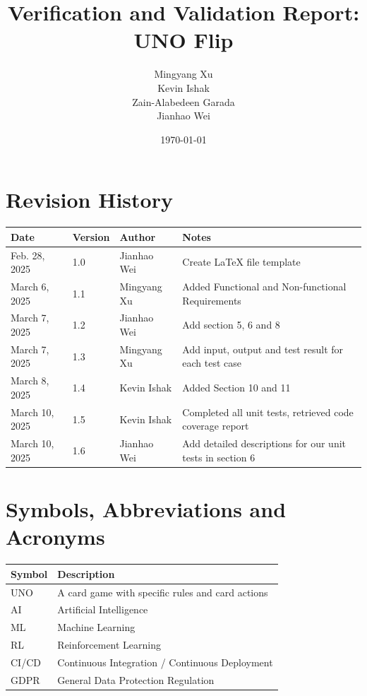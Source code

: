 \documentclass[12pt, titlepage]{article}
\begin{document}
\title{Verification and Validation Report: UNO Flip}
\author{Mingyang Xu\\ Kevin Ishak\\ Zain-Alabedeen Garada\\ Jianhao Wei\\}

\date{\today}

\maketitle


\section{Revision History}

\begin{tabularx}{\textwidth}{p{3cm}p{1cm}p{3cm}X}
\toprule {\bf Date} & {\bf Version} & {\bf Author}& {\bf Notes}\\
\midrule
Feb. 28, 2025 & 1.0 & Jianhao Wei & Create LaTeX file template \\
March 6, 2025 & 1.1 & Mingyang Xu & Added Functional and Non-functional Requirements\\
March 7, 2025 & 1.2 & Jianhao Wei & Add section 5, 6 and 8\\
March 7, 2025 & 1.3 & Mingyang Xu & Add input, output and test result for each test case\\
March 8, 2025 & 1.4 & Kevin Ishak & Added Section 10 and 11\\
March 10, 2025 & 1.5 & Kevin Ishak & Completed all unit tests, retrieved code coverage report\\
March 10, 2025 & 1.6 & Jianhao Wei & Add detailed descriptions for our unit tests in section 6\\

\bottomrule
\end{tabularx}

\newpage

\section{Symbols, Abbreviations and Acronyms}

\renewcommand{\arraystretch}{1.2}
\begin{tabular}{l l} 
  \toprule		
  \textbf{Symbol} & \textbf{Description}\\
  \midrule 
  UNO & A card game with specific rules and card actions\\
  AI & Artificial Intelligence\\
  ML & Machine Learning\\
  RL & Reinforcement Learning\\
  CI/CD & Continuous Integration / Continuous Deployment\\
  GDPR & General Data Protection Regulation\\
  \bottomrule
\end{tabular}\
\end{document}
